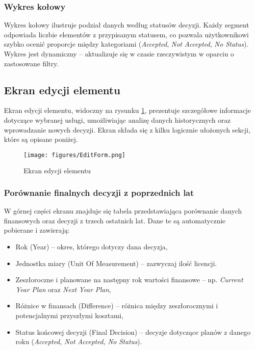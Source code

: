 \subsubsection*{Wykres kołowy}
Wykres kołowy ilustruje podział danych według statusów decyzji. Każdy segment odpowiada liczbie elementów z przypisanym statusem, co pozwala użytkownikowi szybko ocenić proporcje między kategoriami (\textit{Accepted}, \textit{Not Accepted}, \textit{No Status}). Wykres jest dynamiczny -- aktualizuje się w czasie rzeczywistym w oparciu o zastosowane filtry.



\subsection{Ekran edycji elementu}
Ekran edycji elementu, widoczny na rysunku \ref{fig:EditForm}, prezentuje szczegółowe informacje dotyczące wybranej usługi, umożliwiając analizę danych historycznych oraz wprowadzanie nowych decyzji. Ekran składa się z kilku logicznie ułożonych sekcji, które są opisane poniżej.
\begin{figure}[h]
    \centering
    \texttt{[image: figures/EditForm.png]}
    \caption{Ekran edycji elementu}  
    \label{fig:EditForm}
\end{figure}
\subsubsection{Porównanie finalnych decyzji z poprzednich lat}
W górnej części ekranu znajduje się tabela przedstawiająca porównanie danych finansowych oraz decyzji z trzech ostatnich lat. Dane te są automatycznie pobierane i zawierają:
\begin{itemize}
    \item {Rok (Year)} -- okres, którego dotyczy dana decyzja,
    \item {Jednostka miary (Unit Of Measurement)} -- zazwyczaj ilość licencji. 
    \item {Zeszłoroczne i planowane na następny rok wartości finansowe} -- np. \textit{Current Year Plan} oraz \textit{Next Year Plan},
    \item {Różnice w finansach (Difference)} -- różnica między zeszłorocznymi i potencjalnymi przyszłymi kosztami,
    \item {Status końcowej decyzji (Final Decision)} -- decyzje dotyczące planów z danego roku (\textit{Accepted, Not Accepted, No Status}).
\end{itemize}

